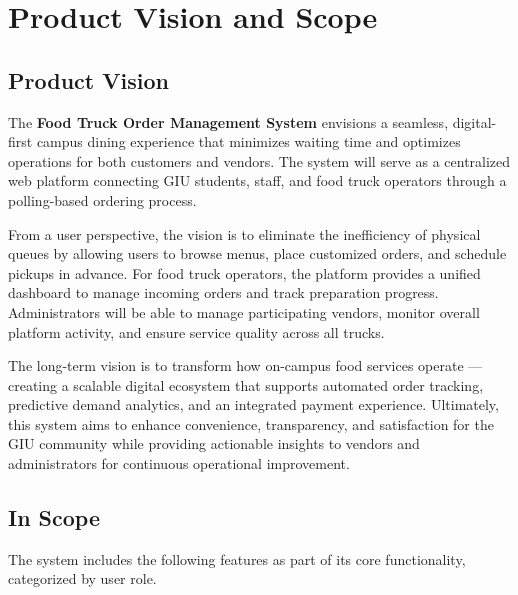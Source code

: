 \documentclass[12pt,a4paper]{article}
\begin{document}
\newpage

\section{Product Vision and Scope}

\subsection{Product Vision}

The \textbf{Food Truck Order Management System} envisions a seamless, digital-first campus dining experience that minimizes waiting time and optimizes operations for both customers and vendors. The system will serve as a centralized web platform connecting GIU students, staff, and food truck operators through a polling-based ordering process.

From a user perspective, the vision is to eliminate the inefficiency of physical queues by allowing users to browse menus, place customized orders, and schedule pickups in advance. For food truck operators, the platform provides a unified dashboard to manage incoming orders and track preparation progress. Administrators will be able to manage participating vendors, monitor overall platform activity, and ensure service quality across all trucks.

The long-term vision is to transform how on-campus food services operate — creating a scalable digital ecosystem that supports automated order tracking, predictive demand analytics, and an integrated payment experience. Ultimately, this system aims to enhance convenience, transparency, and satisfaction for the GIU community while providing actionable insights to vendors and administrators for continuous operational improvement.

\subsection{In Scope}
The system includes the following features as part of its core functionality, categorized by user role.
\end{document}
